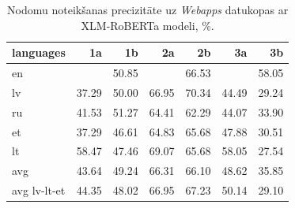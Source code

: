 \begin{table}[htbp]
  \centering
  \caption{Nodomu noteikšanas precizitāte uz \textit{Webapps} datukopas ar XLM-RoBERTa modeli, \%.}
    \begin{tabular}{lrrrrrr}\toprule
    languages & 1a & 1b & 2a & 2b & 3a & 3b \\\midrule
    en    &       & \cellcolor[rgb]{ .965,  .973,  .992}50.85 &       & \cellcolor[rgb]{ .475,  .627,  .82}66.53 &       & \cellcolor[rgb]{ .737,  .812,  .914}58.05 \\
    lv    & \cellcolor[rgb]{ .976,  .659,  .671}37.29 & \cellcolor[rgb]{ .988,  .988,  1}50.00 & \cellcolor[rgb]{ .463,  .62,  .816}66.95 & \cellcolor[rgb]{ .353,  .541,  .776}70.34 & \cellcolor[rgb]{ .984,  .843,  .855}44.49 & \cellcolor[rgb]{ .973,  .455,  .463}29.24 \\
    ru    & \cellcolor[rgb]{ .98,  .769,  .78}41.53 & \cellcolor[rgb]{ .949,  .961,  .988}51.27 & \cellcolor[rgb]{ .541,  .675,  .843}64.41 & \cellcolor[rgb]{ .608,  .722,  .867}62.29 & \cellcolor[rgb]{ .98,  .835,  .843}44.07 & \cellcolor[rgb]{ .976,  .573,  .58}33.90 \\
    et    & \cellcolor[rgb]{ .976,  .659,  .671}37.29 & \cellcolor[rgb]{ .984,  .898,  .91}46.61 & \cellcolor[rgb]{ .525,  .663,  .839}64.83 & \cellcolor[rgb]{ .502,  .647,  .831}65.68 & \cellcolor[rgb]{ .984,  .933,  .945}47.88 & \cellcolor[rgb]{ .973,  .486,  .494}30.51 \\
    lt    & \cellcolor[rgb]{ .725,  .804,  .91}58.47 & \cellcolor[rgb]{ .984,  .922,  .933}47.46 & \cellcolor[rgb]{ .396,  .573,  .792}69.07 & \cellcolor[rgb]{ .502,  .647,  .831}65.68 & \cellcolor[rgb]{ .737,  .812,  .914}58.05 & \cellcolor[rgb]{ .973,  .412,  .42}27.54 \\\midrule
    avg   & \cellcolor[rgb]{ .98,  .824,  .835}43.64 & \cellcolor[rgb]{ .984,  .969,  .976}49.24 & \cellcolor[rgb]{ .482,  .631,  .824}66.31 & \cellcolor[rgb]{ .486,  .635,  .824}66.10 & \cellcolor[rgb]{ .984,  .949,  .961}48.62 & \cellcolor[rgb]{ .976,  .624,  .631}35.85 \\
    avg lv-lt-et & \cellcolor[rgb]{ .98,  .843,  .851}44.35 & \cellcolor[rgb]{ .984,  .937,  .945}48.02 & \cellcolor[rgb]{ .463,  .62,  .816}66.95 & \cellcolor[rgb]{ .451,  .612,  .812}67.23 & \cellcolor[rgb]{ .984,  .988,  1}50.14 & \cellcolor[rgb]{ .973,  .451,  .459}29.10 \\\bottomrule
    \end{tabular}%
  \label{tab:webapps-xml}%
\end{table}%




